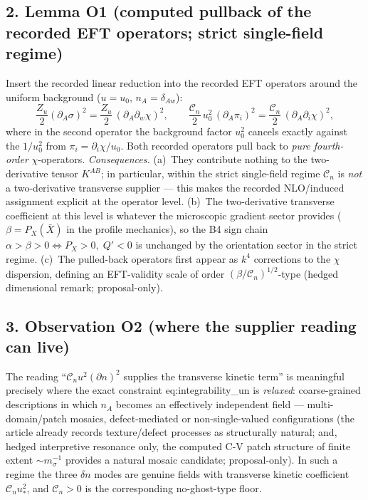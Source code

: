 \subsection*{2. Lemma O1 (computed pullback of the recorded EFT
operators; strict single-field regime)}
Insert the recorded linear reduction into the recorded EFT
operators around the uniform background ($u=u_0$,
$n_A=\delta_{Aw}$):
\[
\frac{Z_u}{2}(\partial_A\sigma)^2
=\frac{Z_u}{2}\,(\partial_A\partial_w\chi)^2 ,
\qquad
\frac{\mathcal C_n}{2}\,u_0^2\,(\partial_A\pi_i)^2
=\frac{\mathcal C_n}{2}\,(\partial_A\partial_i\chi)^2 ,
\]
where in the second operator the background factor $u_0^2$
cancels exactly against the $1/u_0^2$ from
$\pi_i=\partial_i\chi/u_0$.
Both recorded operators pull back to \emph{pure fourth-order}
$\chi$-operators.
\emph{Consequences.}
(a)~They contribute nothing to the two-derivative tensor
$K^{AB}$; in particular, within the strict single-field regime
$\mathcal C_n$ is \emph{not} a two-derivative transverse supplier
--- this makes the recorded NLO/induced assignment explicit at
the operator level.
(b)~The two-derivative transverse coefficient at this level is
whatever the microscopic gradient sector provides
($\beta=P_X(\bar X)$ in the profile mechanics), so the
B4 sign chain
$\alpha>\beta>0\Leftrightarrow P_X>0,\;Q'<0$
is unchanged by the orientation sector in the strict regime.
(c)~The pulled-back operators first appear as $k^4$ corrections
to the $\chi$ dispersion, defining an EFT-validity scale of order
$(\beta/\mathcal C_n)^{1/2}$-type (hedged dimensional remark;
proposal-only).

\subsection*{3. Observation O2 (where the supplier reading can
live)}
The reading ``$\mathcal C_nu^2(\partial n)^2$ supplies the
transverse kinetic term'' is meaningful precisely where the exact
constraint eq:integrability\_un is \emph{relaxed}: coarse-grained
descriptions in which $n_A$ becomes an effectively independent
field --- multi-domain/patch mosaics, defect-mediated or
non-single-valued configurations (the article already records
texture/defect processes as structurally natural; and, hedged
interpretive resonance only, the computed C-V patch structure of
finite extent $\sim m_\sigma^{-1}$ provides a natural mosaic
candidate; proposal-only).
In such a regime the three $\delta n$ modes are genuine fields
with transverse kinetic coefficient $\mathcal C_nu_*^2$, and
$\mathcal C_n>0$ is the corresponding no-ghost-type floor.

